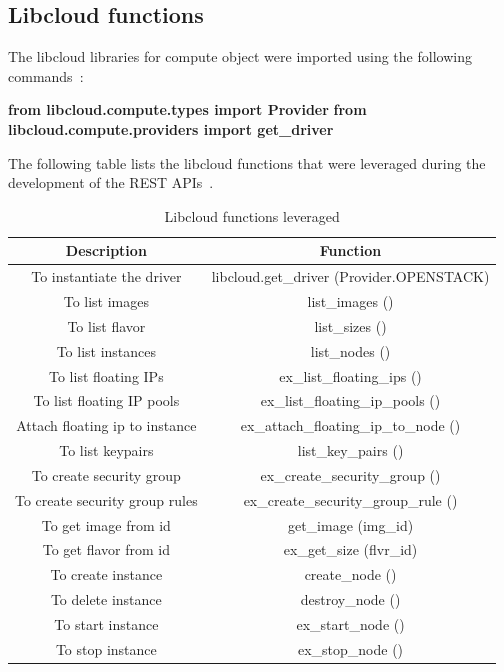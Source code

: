 \subsection{Libcloud functions}
The libcloud libraries for compute object were imported using the following
commands~\cite{hid-sp18-516-www-libcloud-functions}:

\textbf{from libcloud.compute.types import Provider}
\textbf{from libcloud.compute.providers import get\_driver} 

The following table lists the libcloud functions that were leveraged during 
the development of the REST 
APIs~\cite{hid-sp18-516-www-libcloud-functions}. 

\begin{table}[]
\centering
\caption{Libcloud functions leveraged}\label{tab:Description}
\begin{tabular}{*{2}{c}}
\toprule
Description                      & Function \\
\midrule
To instantiate the driver        & libcloud.get\_driver (Provider.OPENSTACK) \\
To list images                   & list\_images () \\
To list flavor                   & list\_sizes () \\
To list instances                & list\_nodes () \\
To list floating IPs             & ex\_list\_floating\_ips () \\
To list floating IP pools        & ex\_list\_floating\_ip\_pools () \\
Attach floating ip to instance   & ex\_attach\_floating\_ip\_to\_node () \\
To list keypairs                 & list\_key\_pairs () \\
To create security group         & ex\_create\_security\_group () \\
To create security group rules   & ex\_create\_security\_group\_rule () \\
To get image from id 	         & get\_image (img\_id) \\
To get flavor from id            & ex\_get\_size (flvr\_id) \\
To create instance               & create\_node () \\
To delete instance               & destroy\_node () \\
To start instance                & ex\_start\_node () \\
To stop instance                 & ex\_stop\_node () \\
\bottomrule
\end{tabular}
\end{table}


